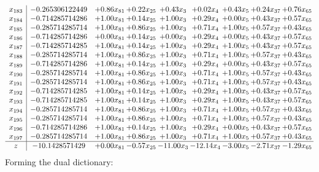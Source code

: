 \documentclass[8pt]{article}
\begin{document}
\[\begin{array}{c| c c@{\hskip 2pt} c@{\hskip 2pt} c@{\hskip 2pt} c@{\hskip 2pt} c@{\hskip 2pt} c@{\hskip 2pt} c@{\hskip 2pt} }
 x_{183}   &  -0.265306122449 & +  0.86 x_{81} & +  0.22 x_{25} & +  0.43 x_{3} & +  0.02 x_{4} & +  0.43 x_{5} & +  0.24 x_{37} & +  0.76 x_{65}\\
 x_{184}   &  -0.714285714286 & +  1.00 x_{81} & +  0.14 x_{25} & +  1.00 x_{3} & +  0.29 x_{4} & +  0.00 x_{5} & +  0.43 x_{37} & +  0.57 x_{65}\\
 x_{185}   &  -0.285714285714 & +  1.00 x_{81} & +  0.86 x_{25} & +  1.00 x_{3} & +  0.71 x_{4} & +  1.00 x_{5} & +  0.57 x_{37} & +  0.43 x_{65}\\
 x_{186}   &  -0.714285714286 & +  0.00 x_{81} & +  0.14 x_{25} & +  0.00 x_{3} & +  0.29 x_{4} & +  0.00 x_{5} & +  0.43 x_{37} & +  0.57 x_{65}\\
 x_{187}   &  -0.714285714285 & +  1.00 x_{81} & +  0.14 x_{25} & +  1.00 x_{3} & +  0.29 x_{4} & +  1.00 x_{5} & +  0.43 x_{37} & +  0.57 x_{65}\\
 x_{188}   &  -0.285714285714 & +  1.00 x_{81} & +  0.86 x_{25} & +  1.00 x_{3} & +  0.71 x_{4} & +  1.00 x_{5} & +  0.57 x_{37} & +  0.43 x_{65}\\
 x_{189}   &  -0.714285714286 & +  1.00 x_{81} & +  0.14 x_{25} & +  1.00 x_{3} & +  0.29 x_{4} & +  0.00 x_{5} & +  0.43 x_{37} & +  0.57 x_{65}\\
 x_{190}   &  -0.285714285714 & +  1.00 x_{81} & +  0.86 x_{25} & +  1.00 x_{3} & +  0.71 x_{4} & +  1.00 x_{5} & +  0.57 x_{37} & +  0.43 x_{65}\\
 x_{191}   &  -0.285714285714 & +  1.00 x_{81} & +  0.86 x_{25} & +  1.00 x_{3} & +  0.71 x_{4} & +  1.00 x_{5} & +  0.57 x_{37} & +  0.43 x_{65}\\
 x_{192}   &  -0.714285714285 & +  1.00 x_{81} & +  0.14 x_{25} & +  1.00 x_{3} & +  0.29 x_{4} & +  1.00 x_{5} & +  0.43 x_{37} & +  0.57 x_{65}\\
 x_{193}   &  -0.714285714285 & +  1.00 x_{81} & +  0.14 x_{25} & +  1.00 x_{3} & +  0.29 x_{4} & +  1.00 x_{5} & +  0.43 x_{37} & +  0.57 x_{65}\\
 x_{194}   &  -0.285714285714 & +  1.00 x_{81} & +  0.86 x_{25} & +  1.00 x_{3} & +  0.71 x_{4} & +  1.00 x_{5} & +  0.57 x_{37} & +  0.43 x_{65}\\
 x_{195}   &  -0.285714285714 & +  1.00 x_{81} & +  0.86 x_{25} & +  1.00 x_{3} & +  0.71 x_{4} & +  1.00 x_{5} & +  0.57 x_{37} & +  0.43 x_{65}\\
 x_{196}   &  -0.714285714286 & +  1.00 x_{81} & +  0.14 x_{25} & +  1.00 x_{3} & +  0.29 x_{4} & +  0.00 x_{5} & +  0.43 x_{37} & +  0.57 x_{65}\\
 x_{197}   &  -0.285714285714 & +  1.00 x_{81} & +  0.86 x_{25} & +  1.00 x_{3} & +  0.71 x_{4} & +  1.00 x_{5} & +  0.57 x_{37} & +  0.43 x_{65}\\
\hline
z    &  -10.1428571429 & +  0.00 x_{81} & -0.57 x_{25} & -11.00 x_{3} & -12.14 x_{4} & -3.00 x_{5} & -2.71 x_{37} & -1.29 x_{65}\\
\end{array}\]
Forming the dual dictionary:
\end{document}
